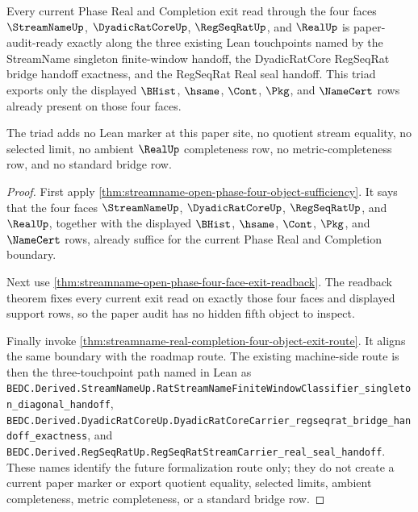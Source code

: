 \begin{theorem}
\label{thm:streamname-open-phase-lean-touchpoint-triad}
Every current Phase Real and Completion exit read through the four faces $\StreamNameUp$, $\DyadicRatCoreUp$, $\RegSeqRatUp$, and $\RealUp$ is paper-audit-ready exactly along the three existing Lean touchpoints named by the StreamName singleton finite-window handoff, the DyadicRatCore RegSeqRat bridge handoff exactness, and the RegSeqRat Real seal handoff. This triad exports only the displayed $\BHist$, $\hsame$, $\Cont$, $\Pkg$, and $\NameCert$ rows already present on those four faces.

The triad adds no Lean marker at this paper site, no quotient stream equality, no selected limit, no ambient $\RealUp$ completeness row, no metric-completeness row, and no standard bridge row.
\end{theorem}
\begin{proof}
First apply \autoref{thm:streamname-open-phase-four-object-sufficiency}. It says that the four faces $\StreamNameUp$, $\DyadicRatCoreUp$, $\RegSeqRatUp$, and $\RealUp$, together with the displayed $\BHist$, $\hsame$, $\Cont$, $\Pkg$, and $\NameCert$ rows, already suffice for the current Phase Real and Completion boundary.

Next use \autoref{thm:streamname-open-phase-four-face-exit-readback}. The readback theorem fixes every current exit read on exactly those four faces and displayed support rows, so the paper audit has no hidden fifth object to inspect.

Finally invoke \autoref{thm:streamname-real-completion-four-object-exit-route}. It aligns the same boundary with the roadmap route. The existing machine-side route is then the three-touchpoint path named in Lean as \texttt{BEDC.Derived.StreamNameUp.RatStreamNameFiniteWindowClassifier\_singleton\_diagonal\_handoff}, \texttt{BEDC.Derived.DyadicRatCoreUp.DyadicRatCoreCarrier\_regseqrat\_bridge\_handoff\_exactness}, and \texttt{BEDC.Derived.RegSeqRatUp.RegSeqRatStreamCarrier\_real\_seal\_handoff}. These names identify the future formalization route only; they do not create a current paper marker or export quotient equality, selected limits, ambient completeness, metric completeness, or a standard bridge row.
\end{proof}

